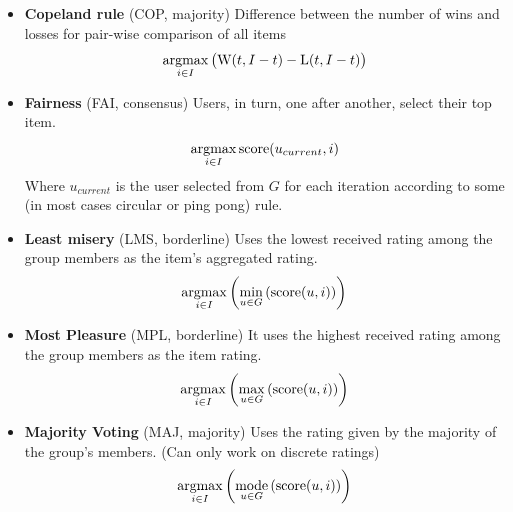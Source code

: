 \begin{itemize}
    \item \textbf{Copeland rule} (COP, majority)\newline
        Difference between the number of wins and losses for pair-wise comparison of all items
        \begin{equation}
            \operatorname*{argmax}_{i \in I}{
                \big(\textrm{W}(t, I - t) - \textrm{L}(t, I - t)\big)
            }
        \end{equation}
    
    \item \textbf{Fairness} (FAI, consensus)\newline
        Users, in turn, one after another, select their top item.
        \begin{equation}
            \operatorname*{argmax}_{i \in I}{{\textrm{score}(u_{current},i)}}
        \end{equation}
        Where $u_{current}$ is the user selected from $G$ for each iteration according to some (in most cases circular or ping pong) rule.
    
    \item \textbf{Least misery} (LMS, borderline)\newline
        Uses the lowest received rating among the group members as the item's aggregated rating.
        \begin{equation}
            \operatorname*{argmax}_{i \in I}{\left(\min_{u \in G}{\left(\textrm{score}(u,i)\right)}\right)}
        \end{equation}
    
    \item \textbf{Most Pleasure} (MPL, borderline)\newline
        It uses the highest received rating among the group members as the item rating.
        \begin{equation}
            \operatorname*{argmax}_{i \in I}{\left(\max_{u \in G}{\left(\textrm{score}(u,i)\right)}\right)}
        \end{equation}
        
    \item \textbf{Majority Voting} (MAJ, majority)\newline
        Uses the rating given by the majority of the group's members. (Can only work on discrete ratings)
        \begin{equation}
            \operatorname*{argmax}_{i \in I}{\left(\operatorname*{mode}_{u \in G}{\left(\textrm{score}(u,i)\right)}\right)}
        \end{equation}
    

\end{itemize}
